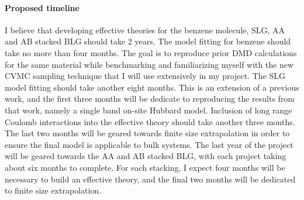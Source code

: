 \documentclass[12pt]{article}
\begin{document}
\paragraph{Proposed timeline} I believe that developing effective theories for the benzene molecule, SLG, AA and AB stacked BLG should take 2 years. 
The model fitting for benzene should take no more than four months.
The goal is to reproduce prior DMD calculations for the same material while benchmarking and familiarizing myself with the new CVMC sampling technique that I will use extensively in my project.
The SLG model fitting should take another eight months.
This is an extension of a previous work, and the first three months will be dedicate to reproducing the results from that work, namely a single band on-site Hubbard model.
Inclusion of long range Coulomb interactions into the effective theory should take another three months.
The last two months will be geared towards finite size extrapolation in order to ensure the final model is applicable to bulk systems.
The last year of the project will be geared towards the AA and AB stacked BLG, with each project taking about six months to complete.
For each stacking, I expect four months will be necessary to build an effective theory, and the final two months will be dedicated to finite size extrapolation.
\end{document}
